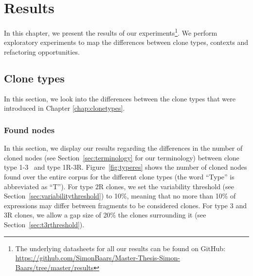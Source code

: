 \chapter{Results}\label{ch:results}
In this chapter, we present the results of our experiments\footnote{The underlying datasheets for all our results can be found on GitHub: \url{https://github.com/SimonBaars/Master-Thesis-Simon-Baars/tree/master/results}}. We perform exploratory experiments to map the differences between clone types, contexts and refactoring opportunities.

\section{Clone types}\label{sec:clonetypeexperiments}
In this section, we look into the differences between the clone types that were introduced in Chapter \ref{chap:clonetypes}.

\subsection{Found nodes}
In this section, we display our results regarding the differences in the number of cloned nodes (see Section~\ref{sec:terminology} for our terminology) between clone type 1-3~\cite{roy2007survey} and type 1R-3R. Figure~\ref{fig:typeres} shows the number of cloned nodes found over the entire corpus for the different clone types (the word ``Type'' is abbreviated as ``T''). For type 2R clones, we set the variability threshold (see Section~\ref{sec:variabilitythreshold}) to 10\%, meaning that no more than 10\% of expressions may differ between fragments to be considered clones. For type 3 and 3R clones, we allow a gap size of 20\% the clones surrounding it (see Section~\ref{sec:t3rthreshold}).

